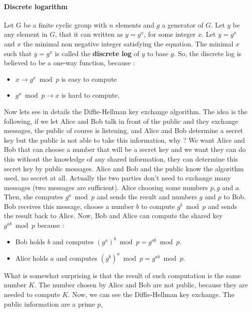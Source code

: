 \documentclass[11pt]{article}
\begin{document}
\paragraph{Discrete logarithm} Let G be a finite cyclic group with $n$ elements and $g$ a generator of $G$. Let $y$ be any element in $G$, that it can written as $y = g^x$, for some integer $x$. Let $y = g^x$ and $x$ the minimal non negative integer satisfying the equation. The minimal $x$ such that $y = g^x$ is called the \textbf{discrete log} of $y$ to base $g$.
So, the discrete log is believed to be a one-way function, because :
\begin{itemize}
\item $x \rightarrow g^x \bmod p $ is easy to compute
\item $g^x \bmod p \rightarrow x$ is hard to compute.
\end{itemize}
Now lets see in details the Diffie-Hellman key exchange algorithm. The idea is the following, if we let Alice and Bob talk in front of the public and they exchange messages, the public of course is listening, and Alice and Bob determine a secret key but the public is not able to take this information, why ? We want Alice and Bob that can choose a number that will be a secret key and we want they can do this without the knowledge of any shared information, they can determine this secret key by public messages. Alice and Bob and the public know the algorithm used, no secret at all. Actually the two parties don't need to exchange many messages (two messages are sufficient). Alice choosing some numbers $p, g$ and $a$. Then, she computes $g^{a} \bmod p$ and sends the result and numbers $g$ and $p$ to Bob. Bob receives this message, choose a number $b$ to compute $g^b \bmod p$ and sends the result back to Alice. Now, Bob and Alice can compute the shared key $g^{ab} \bmod p$ because :
\begin{itemize}
\item Bob holds $b$ and computes $(g^a)^b \bmod p = g^{ab} \bmod p$.
\item Alice holds $a$ and computes $(g^b)^a \bmod p = g^{ab} \bmod p$.
\end{itemize} 
What is somewhat surprising is that the result of such computation is the same number $K$. The number chosen by Alice and Bob are not public, because they are needed to compute $K$. Now, we can see the Diffie-Hellman key exchange. The public information are a prime $p$,
\end{document}
